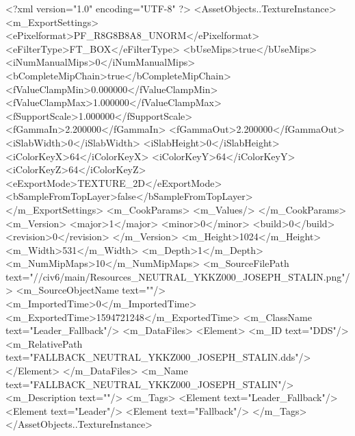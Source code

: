 <?xml version="1.0" encoding="UTF-8" ?>
<AssetObjects..TextureInstance>
	<m_ExportSettings>
		<ePixelformat>PF_R8G8B8A8_UNORM</ePixelformat>
		<eFilterType>FT_BOX</eFilterType>
		<bUseMips>true</bUseMips>
		<iNumManualMips>0</iNumManualMips>
		<bCompleteMipChain>true</bCompleteMipChain>
		<fValueClampMin>0.000000</fValueClampMin>
		<fValueClampMax>1.000000</fValueClampMax>
		<fSupportScale>1.000000</fSupportScale>
		<fGammaIn>2.200000</fGammaIn>
		<fGammaOut>2.200000</fGammaOut>
		<iSlabWidth>0</iSlabWidth>
		<iSlabHeight>0</iSlabHeight>
		<iColorKeyX>64</iColorKeyX>
		<iColorKeyY>64</iColorKeyY>
		<iColorKeyZ>64</iColorKeyZ>
		<eExportMode>TEXTURE_2D</eExportMode>
		<bSampleFromTopLayer>false</bSampleFromTopLayer>
	</m_ExportSettings>
	<m_CookParams>
		<m_Values/>
	</m_CookParams>
	<m_Version>
		<major>1</major>
		<minor>0</minor>
		<build>0</build>
		<revision>0</revision>
	</m_Version>
	<m_Height>1024</m_Height>
	<m_Width>531</m_Width>
	<m_Depth>1</m_Depth>
	<m_NumMipMaps>10</m_NumMipMaps>
	<m_SourceFilePath text="//civ6/main/Resources\FALLBACK_NEUTRAL_YKKZ000_JOSEPH_STALIN.png"/>
	<m_SourceObjectName text=""/>
	<m_ImportedTime>0</m_ImportedTime>
	<m_ExportedTime>1594721248</m_ExportedTime>
	<m_ClassName text="Leader_Fallback"/>
	<m_DataFiles>
		<Element>
			<m_ID text="DDS"/>
			<m_RelativePath text="FALLBACK_NEUTRAL_YKKZ000_JOSEPH_STALIN.dds"/>
		</Element>
	</m_DataFiles>
	<m_Name text="FALLBACK_NEUTRAL_YKKZ000_JOSEPH_STALIN"/>
	<m_Description text=""/>
	<m_Tags>
		<Element text="Leader_Fallback"/>
		<Element text="Leader"/>
		<Element text="Fallback"/>
	</m_Tags>
</AssetObjects..TextureInstance>

